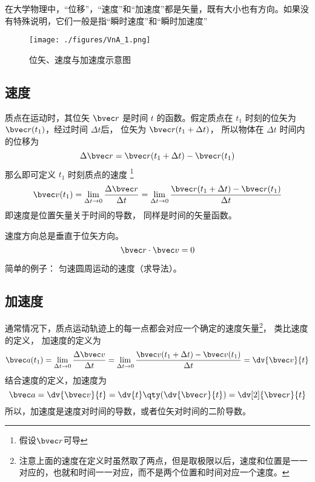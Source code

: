 

在大学物理中，“位移”，“速度”和“加速度”都是矢量，既有大小也有方向。如果没有特殊说明，它们一般是指“瞬时速度”和“瞬时加速度”

\begin{figure}[ht]
\centering
\texttt{[image: ./figures/VnA\_1.png]}
\caption{位矢、速度与加速度示意图} \label{VnA_fig1}
\end{figure}

\subsection{速度}

质点在运动时，其位矢 $\bvec r$ 是时间 $t$ 的函数。假定质点在 $t_1$ 时刻的位矢为 $\bvec r(t_1)$，经过时间 $\Delta t$后， 位矢为 $\bvec r(t_1 + \Delta t)$， 所以物体在 $\Delta t$ 时间内的位移为
\begin{equation}
\Delta \bvec r = \bvec r (t_1 + \Delta t) - \bvec r (t_1)
\end{equation}
那么即可定义 $t_1$ 时刻质点的速度
\footnote{假设$\bvec r$可导}
\begin{equation}
\bvec v(t_1) = \lim_{\Delta t \to 0} \frac{\Delta \bvec r}{\Delta t} = \lim_{\Delta t \to 0} \frac{\bvec r (t_1 + \Delta t) - \bvec r(t_1)}{\Delta t}
\end{equation}
即速度是位置矢量关于时间的导数， 同样是时间的矢量函数。

\begin{theorem}{}
速度方向总是垂直于位矢方向。
\begin{equation}
\bvec r \cdot \bvec v = 0
\end{equation}
\end{theorem}

简单的例子： 匀速圆周运动的速度（求导法）。

\subsection{加速度}

通常情况下，质点运动轨迹上的每一点都会对应一个确定的速度矢量\footnote{注意上面的速度在定义时虽然取了两点，但是取极限以后，速度和位置是一一对应的，也就和时间一一对应，而不是两个位置和时间对应一个速度。}， 类比速度的定义， 加速度的定义为
\begin{equation}\label{VnA_eq4}
\bvec a(t_1) = \lim_{\Delta t \to 0} \frac{\Delta \bvec v}{\Delta t}
= \lim_{\Delta t \to 0} \frac{\bvec v(t_1 + \Delta t) - \bvec v (t_1)}{\Delta t} = \dv{\bvec v}{t}
\end{equation}
结合速度的定义，加速度为
\begin{equation}
\bvec a = \dv{\bvec v}{t} = \dv{t} \qty( \dv{\bvec r}{t} ) = \dv[2]{\bvec r}{t}
\end{equation}
所以，加速度是速度对时间的导数，或者位矢对时间的二阶导数。

